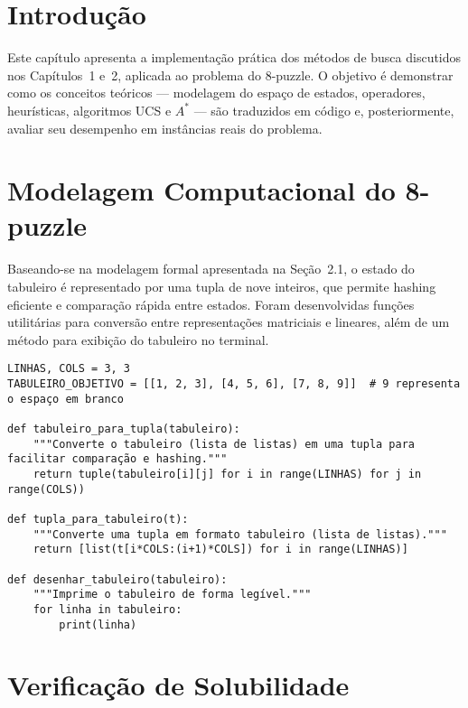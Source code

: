   
\section{Introdução}  
  
Este capítulo apresenta a implementação prática dos métodos de busca discutidos nos Capítulos~1 e~2, aplicada ao problema do 8-puzzle. O objetivo é demonstrar como os conceitos teóricos — modelagem do espaço de estados, operadores, heurísticas, algoritmos UCS e $A^*$ — são traduzidos em código e, posteriormente, avaliar seu desempenho em instâncias reais do problema.  
  
\section{Modelagem Computacional do 8-puzzle}  
  
Baseando-se na modelagem formal apresentada na Seção~2.1, o estado do tabuleiro é representado por uma tupla de nove inteiros, que permite hashing eficiente e comparação rápida entre estados. Foram desenvolvidas funções utilitárias para conversão entre representações matriciais e lineares, além de um método para exibição do tabuleiro no terminal.  
  
\begin{verbatim}  
LINHAS, COLS = 3, 3  
TABULEIRO_OBJETIVO = [[1, 2, 3], [4, 5, 6], [7, 8, 9]]  # 9 representa o espaço em branco  
  
def tabuleiro_para_tupla(tabuleiro):  
    """Converte o tabuleiro (lista de listas) em uma tupla para facilitar comparação e hashing."""  
    return tuple(tabuleiro[i][j] for i in range(LINHAS) for j in range(COLS))  
  
def tupla_para_tabuleiro(t):  
    """Converte uma tupla em formato tabuleiro (lista de listas)."""  
    return [list(t[i*COLS:(i+1)*COLS]) for i in range(LINHAS)]  
  
def desenhar_tabuleiro(tabuleiro):  
    """Imprime o tabuleiro de forma legível."""  
    for linha in tabuleiro:  
        print(linha)  
\end{verbatim}  
  
\section{Verificação de Solubilidade}  
  
